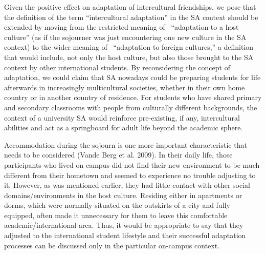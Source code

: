 \documentclass[12pt]{article}
\newenvironment{styleStandard}{\setlength\leftskip{0cm}\setlength\rightskip{0cm plus 1fil}\setlength\parindent{0cm}\setlength\parfillskip{0pt plus 1fil}\setlength\parskip{0in plus 1pt}\writerlistparindent\writerlistleftskip\leavevmode\normalfont\normalsize\writerlistlabel\ignorespaces}{\unskip\vspace{0.111in plus 0.0111in}\par}
\newcommand\writerlistleftskip{}
\newcommand\writerlistparindent{}
\newcommand\writerlistlabel{}
\begin{document}
\begin{styleStandard}
Given the positive effect on adaptation of intercultural friendships, we pose that the definition of the term “intercultural adaptation” in the SA context should be extended by moving from the restricted meaning of \ “adaptation to a host culture” (as if the sojourner was just encountering one new culture in the SA context) to the wider meaning of \ “adaptation to foreign cultures,” a definition that would include, not only the host culture, but also those brought to the SA context by other international students. By reconsidering the concept of adaptation, we could claim that SA nowadays could be preparing students for life afterwards in increasingly multicultural societies, whether in their own home country or in another country of residence. For students who have shared primary and secondary classrooms with people from culturally different backgrounds, the context of a university SA would reinforce pre-existing, if any, intercultural abilities and act as a springboard for adult life beyond the academic sphere. 
\end{styleStandard}

\begin{styleStandard}
Accommodation during the sojourn is one more important characteristic that needs to be considered (Vande Berg et al. 2009). In their daily life, those participants who lived on campus did not find their new environment to be much different from their hometown and seemed to experience no trouble adjusting to it. However, as was mentioned earlier, they had little contact with other social domains/environments in the host culture. Residing either in apartments or dorms, which were normally situated on the outskirts of a city and fully equipped, often made it unnecessary for them to leave this comfortable academic/international area. Thus, it would be appropriate to say that they adjusted to the international student lifestyle and their successful adaptation processes can be discussed only in the particular on-campus context. 
\end{styleStandard}
\end{document}
